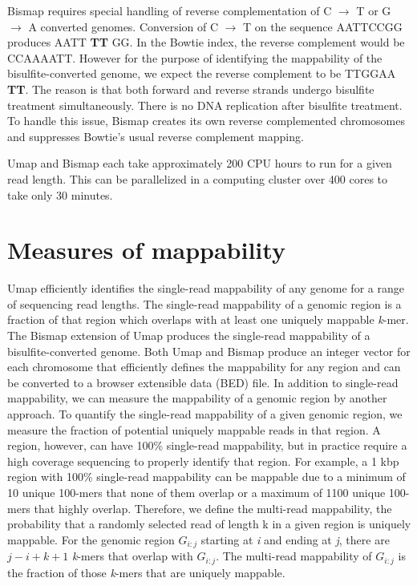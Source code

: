 \documentclass[letterpaper,10pt,english]{sphinxmanual}
\begin{document}
Bismap requires special handling of reverse complementation of C \(\rightarrow\) T
or G \(\rightarrow\) A converted genomes.
Conversion of C \(\rightarrow\) T on the sequence AATTCCGG produces AATT \textbf{TT} GG.
In the Bowtie index, the reverse complement would be CCAAAATT.
However for the purpose of identifying the mappability of the bisulfite-converted genome,
we expect the reverse complement to be TTGGAA \textbf{TT}. The reason is that both forward and reverse
strands undergo bisulfite treatment simultaneously. There is no DNA replication after bisulfite treatment.
To handle this issue, Bismap creates its own reverse complemented chromosomes and suppresses Bowtie's usual reverse complement mapping.

Umap and Bismap each take approximately 200 CPU hours to run for a given read length. This can be parallelized in a computing cluster over 400 cores to take only 30 minutes.


\section{Measures of mappability}
\label{documentation:measures-of-mappability}
Umap efficiently identifies the single-read mappability of any genome for a
range of sequencing read lengths. The single-read mappability of a genomic
region is a fraction of that region which overlaps with at least one uniquely
mappable \emph{k}-mer. The Bismap extension of Umap produces the single-read mappability
of a bisulfite-converted genome. Both Umap and Bismap produce an integer vector for
each chromosome that efficiently defines the mappability for any region and can be
converted to a browser extensible data (BED) file. In addition to single-read mappability,
we can measure the mappability of a genomic region by another approach. To quantify
the single-read mappability of a given genomic region, we measure the fraction of
potential uniquely mappable reads in that region. A region, however, can have 100\% single-read
mappability, but in practice require a high coverage sequencing to properly identify that region.
For example, a 1 kbp region with 100\% single-read mappability can be mappable due to a
minimum of 10 unique 100-mers that none of them overlap or a maximum of 1100 unique 100-mers
that highly overlap. Therefore, we define the multi-read mappability, the probability that a
randomly selected read of length k in a given region is uniquely mappable. For the genomic
region \(G_{i:j}\) starting at \emph{i} and ending at \emph{j}, there are \(j - i + k + 1\)
\emph{k}-mers that overlap with \(G_{i:j}\).
The multi-read mappability of \(G_{i:j}\) is the fraction of those \emph{k}-mers that are uniquely mappable.
\end{document}
